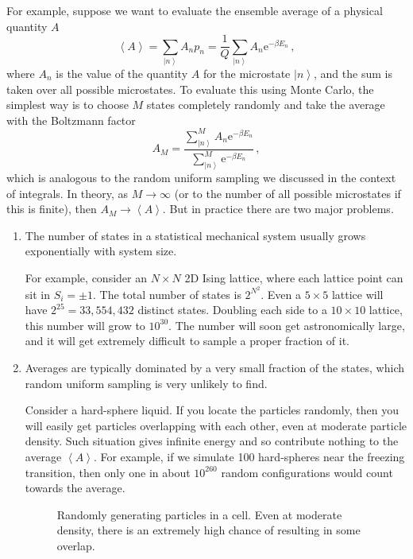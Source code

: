 \documentclass{article}
\theoremstyle{plain}\theoremheaderfont{\normalfont\itshape}\theorembodyfont{\rmfamily}\theoremseparator{.}\newtheorem*{rem}{Remark}\newtheorem*{ex}{Example}\newtheorem*{proof}{Proof}\newtheorem*{altp}{Alternative proof}
\theoremstyle{plain}\theoremheaderfont{\normalfont\bfseries}\theorembodyfont{\rmfamily}\theoremseparator{.}\newtheorem{thm}{Theorem}[section]\newtheorem{lem}[thm]{Lemma}\newtheorem{prop}[thm]{Proposition}\newtheorem*{cor}{Corollary}\newtheorem{defn}[thm]{Definition}\newtheorem{clm}[thm]{Claim}\newtheorem{clminproof}{Claim}\newtheorem{alg}[thm]{Algorithm}\newtheorem{hyp}[thm]{Hypothesis}\newtheorem{law}[thm]{Law}
\theoremstyle{break}\theoremheaderfont{\normalfont\itshape}\theorembodyfont{\rmfamily}\theoremseparator{.\medskip}\newtheorem*{proofskip}{Proof}\newtheorem*{exs}{Examples}\newtheorem*{rems}{Remarks}
\theoremstyle{break}\theoremheaderfont{\normalfont\bfseries}\theorembodyfont{\rmfamily}\theoremseparator{.\medskip}\newtheorem{lemskip}[thm]{Lemma}\newtheorem{defnskip}[thm]{Definition}\newtheorem{propskip}[thm]{Proposition}\newtheorem{thmskip}[thm]{Theorem}
\numberwithin{equation}{section}
\newcommand{\ee}{\mathrm{e}}
\newcommand{\ket}[1]{\left| #1 \right\rangle}
\newcommand{\eval}[1]{\left\langle #1 \right\rangle}
\begin{document}
    For example, suppose we want to evaluate the ensemble average of a physical quantity \(A\)
    \begin{equation}
        \eval{A}=\sum_{\ket{n}} A_n p_n=\frac{1}{Q}\sum_{\ket{n}} A_n \ee^{-\beta E_n}\,,
    \end{equation}
    where \(A_n\) is the value of the quantity \(A\) for the microstate \(\ket{n}\), and the sum is taken over all possible microstates. To evaluate this using Monte Carlo, the simplest way is to choose \(M\) states completely randomly and take the average with the Boltzmann factor
    \begin{equation}
        A_M=\frac{\sum_{\ket{n}}^{M}A_n \ee^{-\beta E_n}}{\sum_{\ket{n}}^{M}\ee^{-\beta E_n}}\,,
    \end{equation}
    which is analogous to the random uniform sampling we discussed in the context of integrals. In theory, as \(M\to\infty\) (or to the number of all possible microstates if this is finite), then \(A_M\to \eval{A}\). But in practice there are two major problems.
    \begin{enumerate}[topsep=0pt]
        \item The number of states in a statistical mechanical system usually grows exponentially with system size.
        
        For example, consider an \(N\times N\) 2D Ising lattice, where each lattice point can sit in \(S_i=\pm 1\). The total number of states is \(2^{N^2}\). Even a \(5\times 5\) lattice will have \(2^{25}=33,554,432\) distinct states. Doubling each side to a \(10\times 10\) lattice, this number will grow to \(10^{30}\). The number will soon get astronomically large, and it will get extremely difficult to sample a proper fraction of it.
        \item Averages are typically dominated by a very small fraction of the states, which random uniform sampling is very unlikely to find.
        
        Consider a hard-sphere liquid. If you locate the particles randomly, then you will easily get particles overlapping with each other, even at moderate particle density. Such situation gives infinite energy and so contribute nothing to the average \(\eval{A}\). For example, if we simulate 100 hard-spheres near the freezing transition, then only one in about \(10^{260}\) random configurations would count towards the average.

        \begin{figure}[ht!]
            \centering
            \caption{Randomly generating particles in a cell. Even at moderate density, there is an extremely high chance of resulting in some overlap.}
        \end{figure}
    \end{enumerate}
\end{document}
